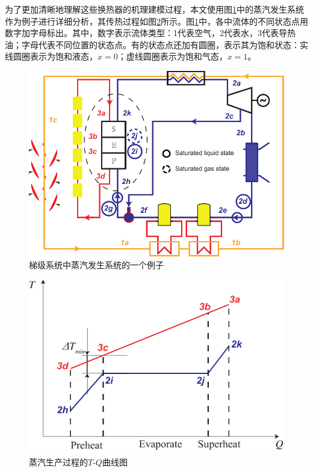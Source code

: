 为了更加清晰地理解这些换热器的机理建模过程，本文使用图\ref{fig:PES}中的蒸汽发生系统作为例子进行详细分析，其传热过程如图\ref{fig:PES_TQ}所示。图\ref{fig:PES}中，各中流体的不同状态点用数字加字母标出。其中，数字表示流体类型：1代表空气，2代表水，3代表导热油；字母代表不同位置的状态点。有的状态点还加有圆圈，表示其为饱和状态：实线圆圈表示为饱和液态，$x = 0$；虚线圆圈表示为饱和气态，$x = 1$。


\noindent \begin{figure}[!ht]
\begin{center}
	\includegraphics[width = 0.8\columnwidth]{fig/PES}
	\caption{梯级系统中蒸汽发生系统的一个例子}
	\label{fig:PES}
\end{center}
\end{figure}

\noindent \begin{figure}[htbp]
\begin{center}
	\includegraphics[width = 0.5\columnwidth]{fig/PES_TQ}
	\caption{蒸汽生产过程的$T$-$Q$曲线图}
	\label{fig:PES_TQ}
\end{center}
\end{figure}

